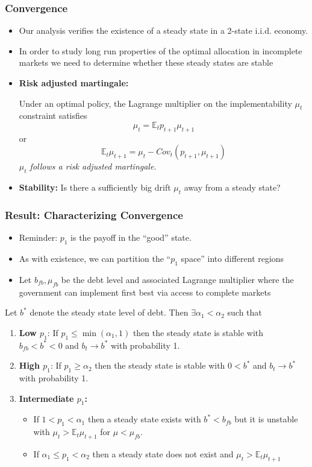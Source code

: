 \documentclass{beamer}
\newcommand{\EE}{\mathbb E}
\begin{document}
 \begin{frame}
  \frametitle{Convergence}
  \begin{itemize}
		\item Our analysis verifies the existence of a steady state in a 2-state i.i.d. economy.
		\item In order to study long run properties of the optimal allocation in incomplete markets we need to determine whether these steady states are stable 
		\item \textbf{Risk adjusted martingale:}
		
		Under an optimal policy, the Lagrange multiplier on the implementability $\mu_t$ constraint satisfies
		\[
			\mu_t = \EE_t p_{t+1} \mu_{t+1}
		\] or
		\[
		\EE_t  \mu_{t+1}	= \mu_t -Cov_t (p_{t+1}, \mu_{t+1})
		\]
			\emph{$\mu_t$ follows a risk adjusted martingale.}
	
		\item \textbf{Stability: } Is there a sufficiently big drift  $\mu_t$  away from a steady state?
		\end{itemize}
	
 \end{frame}



 \begin{frame}
  \frametitle{Result: Characterizing Convergence}

  \begin{itemize}
  \item Reminder:  $p_1$ is the payoff in the ``good'' state.
   \item As with existence, we can partition  the ``$p_1$ space'' into different regions
   \item Let $b_{fb},\mu_{fb}$ be the debt level and associated Lagrange multiplier where the government can implement first best via  access to complete markets
  \end{itemize}
  \small
 	\begin{theorem}
Let $b^*$ denote the steady state level of debt.  Then $\exists  \alpha_1 < \alpha_2$ such that
		\begin{enumerate}
			\item  \textbf{Low $p_1$}: If $p_1\leq\min(\alpha_1,1)$ then the steady state is stable with $b_{fb}<b^*<0$ and $b_t\rightarrow b^*$ with probability 1.
			\item \textbf{High  $p_1$}:  If $p_1 \geq \alpha_2$ then the steady state is stable with $0<b^*$ and $b_t \rightarrow b^*$ with probability 1.
			\item \textbf{Intermediate $p_1$:}
			\begin{itemize}
			  \item  If $1 < p_1 <\alpha_1$ then a steady state exists with $b^* < b_{fb}$ but it is unstable with $\mu_t >\EE_t \mu_{t+1}$ for $\mu < \mu_{fb}$.
			\item  If $\alpha_1\leq p_1<\alpha_2$ then a steady state does not exist and $\mu_t > \EE_t\mu_{t+1}$
			\end{itemize}
		
		\end{enumerate}
	\end{theorem}
 \end{frame}
\end{document}
